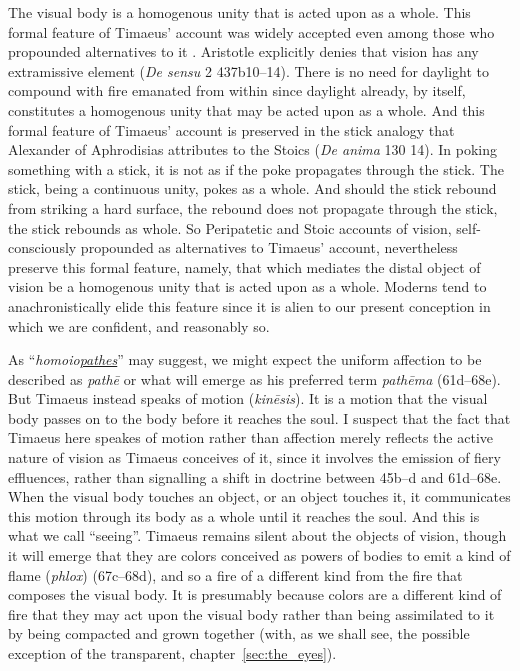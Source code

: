 The visual body is a homogenous unity that is acted upon as a whole. This formal feature of Timaeus' account was widely accepted even among those who propounded alternatives to it \cite[chapter 1]{Lindberg:1977aa}. Aristotle explicitly denies that vision has any extramissive element (\emph{De sensu} 2 437b10--14). There is no need for daylight to compound with fire emanated from within since daylight already, by itself, constitutes a homogenous unity that may be acted upon as a whole. And this formal feature of Timaeus' account is preserved in the stick analogy that Alexander of Aphrodisias attributes to the Stoics (\emph{De anima} 130 14). In poking something with a stick, it is not as if the poke propagates through the stick. The stick, being a continuous unity, pokes as a whole. And should the stick rebound from striking a hard surface, the rebound does not propagate through the stick, the stick rebounds as whole. So Peripatetic and Stoic accounts of vision, self-consciously propounded as alternatives to Timaeus' account, nevertheless preserve this formal feature, namely, that which mediates the distal object of vision be a homogenous unity that is acted upon as a whole. Moderns tend to anachronistically elide this feature since it is alien to our present conception in which we are confident, and reasonably so.

As ``\emph{homoio\underline{pathes}}'' may suggest, we might expect the uniform affection to be described as \emph{pathē} or what will emerge as his preferred term \emph{pathēma} (61d--68e). But Timae\-us instead speaks of motion (\emph{kinēsis}). It is a motion that the visual body passes on to the body before it reaches the soul. I suspect that the fact that Timaeus here speakes of motion rather than affection merely reflects the active nature of vision as Timaeus conceives of it, since it involves the emission of fiery effluences, rather than signalling a shift in doctrine between 45b--d and 61d--68e. When the visual body touches an object, or an object touches it, it communicates this motion through its body as a whole until it reaches the soul. And this is what we call ``seeing''. Timaeus remains silent about the objects of vision, though it will emerge that they are colors conceived as powers of bodies to emit a kind of flame (\emph{phlox}) (67c–68d), and so a fire of a different kind from the fire that composes the visual body. It is presumably because colors are a different kind of fire that they may act upon the visual body rather than being assimilated to it by being compacted and grown together (with, as we shall see, the possible exception of the transparent, chapter~\ref{sec:the_eyes}).

